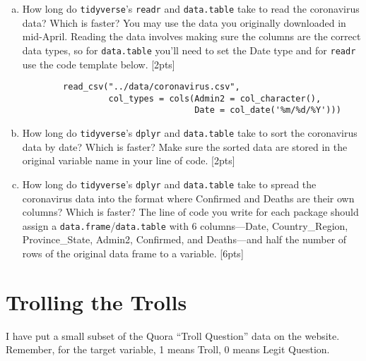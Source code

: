 \documentclass[12pt]{article}
\begin{document}
\begin{enumerate}[(a)]
	\item How long do \verb|tidyverse|'s \verb|readr| and \verb|data.table| take to read the coronavirus data? Which is faster? You may use the data you originally downloaded in mid-April. Reading the data involves making sure the columns are the correct data types, so for \verb|data.table| you'll need to set the Date type and for \verb|readr| use the code template below. [2pts]
	\begin{verbatim}
		read_csv("../data/coronavirus.csv",
		         col_types = cols(Admin2 = col_character(),
		                          Date = col_date('%m/%d/%Y')))
	\end{verbatim}
	\item How long do \verb|tidyverse|'s \verb|dplyr| and \verb|data.table| take to sort the coronavirus data by date? Which is faster? Make sure the sorted data are stored in the original variable name in your line of code. [2pts]
	\item How long do \verb|tidyverse|'s \verb|dplyr| and \verb|data.table| take to spread the coronavirus data into the format where Confirmed and Deaths are their own columns? Which is faster? The line of code you write for each package should assign a \verb|data.frame|/\verb|data.table| with 6 columns---Date, Country\_Region, Province\_State, Admin2, Confirmed, and Deaths---and half the number of rows of the original data frame to a variable. [6pts]
\end{enumerate}

\section{Trolling the Trolls}

I have put a small subset of the Quora ``Troll Question'' data on the website. Remember, for the target variable, 1 means Troll, 0 means Legit Question.
\end{document}
